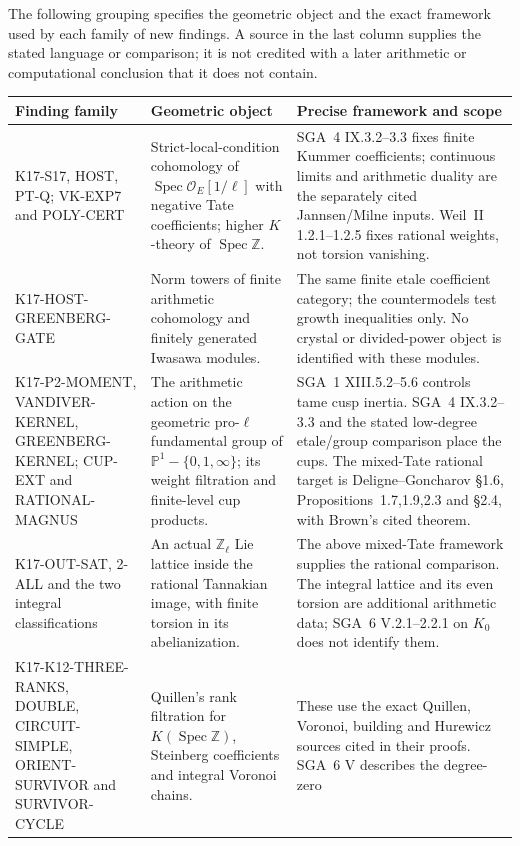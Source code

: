 \documentclass[11pt,a4paper]{article}
\theoremstyle{definition}
\begin{document}
The following grouping specifies the geometric object and the exact
framework used by each family of new findings. A source in the last
column supplies the stated language or comparison; it is not credited
with a later arithmetic or computational conclusion that it does not
contain.

\small
\begin{longtable}{p{}p{}p{}}
\toprule
Finding family & Geometric object & Precise framework and scope\\
\midrule
\endhead
K17-S17, HOST, PT-Q; VK-EXP7 and POLY-CERT &
Strict-local-condition cohomology of
$\operatorname{Spec}\mathcal O_E[1/\ell]$ with negative Tate
coefficients; higher $K$-theory of $\operatorname{Spec}\mathbb Z$. &
SGA~4 IX.3.2--3.3 fixes finite Kummer coefficients; continuous limits
and arithmetic duality are the separately cited Jannsen/Milne inputs.
Weil~II 1.2.1--1.2.5 fixes rational weights, not torsion vanishing.\\
K17-HOST-GREENBERG-GATE &
Norm towers of finite arithmetic cohomology and finitely generated
Iwasawa modules. &
The same finite etale coefficient category; the countermodels test
growth inequalities only. No crystal or divided-power object is
identified with these modules.\\
K17-P2-MOMENT, VANDIVER-KERNEL, GREENBERG-KERNEL;
CUP-EXT and RATIONAL-MAGNUS &
The arithmetic action on the geometric pro-$\ell$ fundamental group
of $\mathbb P^1-\{0,1,\infty\}$; its weight filtration and
finite-level cup products. &
SGA~1 XIII.5.2--5.6 controls tame cusp inertia. SGA~4 IX.3.2--3.3
and the stated low-degree etale/group comparison place the cups.
The mixed-Tate rational target is Deligne--Goncharov \S1.6,
Propositions~1.7,1.9,2.3 and \S2.4, with Brown's cited theorem.\\
K17-OUT-SAT, 2-ALL and the two integral classifications &
An actual $\mathbb Z_\ell$ Lie lattice inside the rational
Tannakian image, with finite torsion in its abelianization. &
The above mixed-Tate framework supplies the rational comparison.
The integral lattice and its even torsion are additional arithmetic
data; SGA~6 V.2.1--2.2.1 on $K_0$ does not identify them.\\
K17-K12-THREE-RANKS, DOUBLE, CIRCUIT-SIMPLE,
ORIENT-SURVIVOR and SURVIVOR-CYCLE &
Quillen's rank filtration for $K(\operatorname{Spec}\mathbb Z)$,
Steinberg coefficients and integral Voronoi chains. &
These use the exact Quillen, Voronoi, building and Hurewicz sources
cited in their proofs. SGA~6 V describes the degree-zero

\end{longtable}
\end{document}
